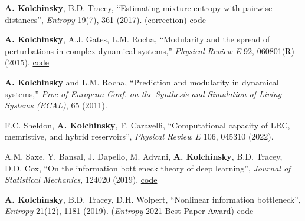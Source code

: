 \textbf{A. Kolchinsky}, B.D. Tracey, ``Estimating mixture entropy with pairwise distances'', \emph{Entropy} 19(7), 361 (2017). (\href{https://www.mdpi.com/1099-4300/19/11/588}{correction})  \href{https://github.com/btracey/mixent/}{code}  %

\textbf{A. Kolchinsky}\CA, A.J. Gates, L.M. Rocha, ``Modularity and the spread of perturbations in complex dynamical systems,'' \emph{Physical Review E} 92, 060801(R) (2015).  \href{https://github.com/artemyk/perturbationmodularity/}{code} 

\textbf{A. Kolchinsky} and L.M. Rocha, ``Prediction and modularity in dynamical systems,'' \emph{Proc of European Conf. on the Synthesis and Simulation of Living Systems (ECAL)}, 65 (2011).  


\vspace{15pt}

F.C. Sheldon, \textbf{A. Kolchinsky}, F. Caravelli, ``Computational capacity of LRC, memristive, and hybrid reservoirs'', \emph{Physical Review E} 106, 045310 (2022).  

A.M. Saxe, Y. Bansal, J. Dapello, M. Advani, \textbf{A. Kolchinsky}, B.D. Tracey, D.D. Cox, ``On the information bottleneck theory of deep learning'',  \emph{Journal of Statistical Mechanics}, 124020 (2019).  \href{https://github.com/artemyk/ibsgd/tree/iclr2018}{code}  %

\textbf{A. Kolchinsky}\CA, B.D. Tracey, D.H. Wolpert, ``Nonlinear information bottleneck'', \emph{Entropy} 21(12), 1181 (2019). (\href{https://www.mdpi.com/journal/entropy/awards/1209}{{\emph{Entropy} 2021 Best Paper Award}})  \href{https://github.com/artemyk/nonlinearIB}{code}  %

